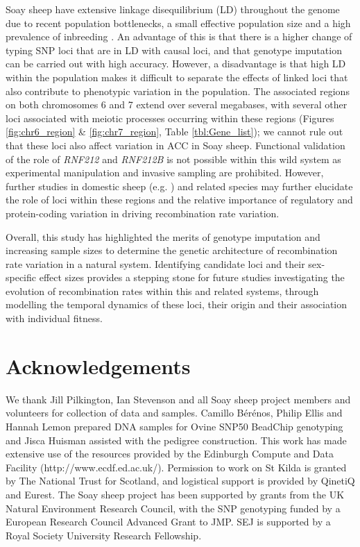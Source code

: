 \documentclass[a4paper,11pt]{article}
\begin{document}
Soay sheep have extensive linkage disequilibrium (LD) throughout the genome due to recent population bottlenecks, a small effective population size and a high prevalence of inbreeding \citep{CluttonBrock2004, Stoffel2020}. An advantage of this is that there is a higher change of typing SNP loci that are in LD with causal loci, and that genotype imputation can be carried out with high accuracy. However, a disadvantage is that high LD within the population makes it difficult to separate the effects of linked loci that also contribute to phenotypic variation in the population. The associated regions on both chromosomes 6 and 7 extend over several megabases, with several other loci associated with meiotic processes occurring within these regions (Figures \ref{fig:chr6_region} \& \ref{fig:chr7_region}, Table \ref{tbl:Gene_list}); we cannot rule out that these loci also affect variation in ACC in Soay sheep. Functional validation of the role of \textit{RNF212} and \textit{RNF212B} is not possible within this wild system as experimental manipulation and invasive sampling are prohibited. However, further studies in domestic sheep (e.g. \citealt{Petit2017}) and related species may further elucidate the role of loci within these regions and the relative importance of regulatory and protein-coding variation in driving recombination rate variation.

Overall, this study has highlighted the merits of genotype imputation and increasing sample sizes to determine the genetic architecture of recombination rate variation in a natural system. Identifying candidate loci and their sex-specific effect sizes provides a stepping stone for future studies investigating the evolution of recombination rates within this and related systems, through modelling the temporal dynamics of these loci, their origin and their association with individual fitness.


\section*{Acknowledgements}

We thank Jill Pilkington, Ian Stevenson and all Soay sheep project members and volunteers for collection of data and samples. Camillo B\'er\'enos, Philip Ellis and Hannah Lemon prepared DNA samples for Ovine SNP50 BeadChip genotyping and Jisca Huisman assisted with the pedigree construction. This work has made extensive use of the resources provided by the Edinburgh Compute and Data Facility (http://www.ecdf.ed.ac.uk/). Permission to work on St Kilda is granted by The National Trust for Scotland, and logistical support is provided by QinetiQ and Eurest. The Soay sheep project has been supported by grants from the UK Natural Environment Research Council, with the SNP genotyping funded by a European Research Council Advanced Grant to JMP. SEJ is supported by a Royal Society University Research Fellowship. 
\end{document}
